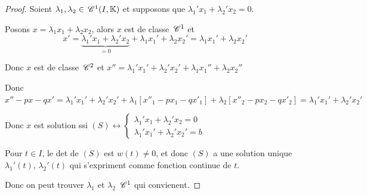 \begin{proof}
    Soient $\lambda_1, \lambda_2 \in \,\mathscr C^{1}(I, \mathbb{K})$ et supposons que 
    $\lambda_1' x_1 + \lambda_2' x_2 = 0$. 

    Posons $x = \lambda_1 x_1 + \lambda_2 x_2$, alors $x$ est de classe $\,\mathscr C^{1}$ et 
    $$x' = \underbrace{\lambda_1' x_1 + \lambda_2' x_2}_{ = 0} + \lambda_1 x_1' + \lambda_2 x_2' = \lambda_1 x_1' + \lambda_2 x_2'$$

    Donc $x$ est de classe $\,\mathscr C^{2}$ et $x'' = \lambda_1' x_1' + \lambda_2' x_2' + \lambda_1 x_1'' + \lambda_2 x_2''$

    Donc $x'' - px - qx' = \lambda_1' x_1' + \lambda_2' x_2' + \lambda_1 [x''_1 - px_1 - qx'_1] + \lambda_2[x''_2 - px_2 - qx'_2] = \lambda_1' x_1' + \lambda_2' x_2' $

    Donc $x$ est solution ssi $(S) \leftrightarrow \begin{cases}
        \lambda_1' x_1 + \lambda_2' x_2 = 0 \\
        \lambda_1' x_1' + \lambda_2' x_2' = b
    \end{cases}$

    Pour $t \in I$, le det de $(S)$ est $w(t) \neq 0$, et donc $(S)$ a une solution unique 
    $\lambda_1'(t)$, $\lambda_2'(t)$ qui s'expriment comme fonction continue de $t$. 

    Donc on peut trouver $\lambda_1$ et $\lambda_2$ $\,\mathscr C^{1}$ qui convienent.
\end{proof}

